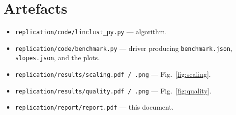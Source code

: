 \documentclass[11pt,a4paper]{article}
\begin{document}
\section{Artefacts}
\begin{itemize}
    \item \texttt{replication/code/linclust\_py.py} --- algorithm.
    \item \texttt{replication/code/benchmark.py} --- driver producing
      \texttt{benchmark.json}, \texttt{slopes.json}, and the plots.
    \item \texttt{replication/results/scaling.pdf / .png} ---
      Fig.~\ref{fig:scaling}.
    \item \texttt{replication/results/quality.pdf / .png} ---
      Fig.~\ref{fig:quality}.
    \item \texttt{replication/report/report.pdf} --- this document.
\end{itemize}
\end{document}
